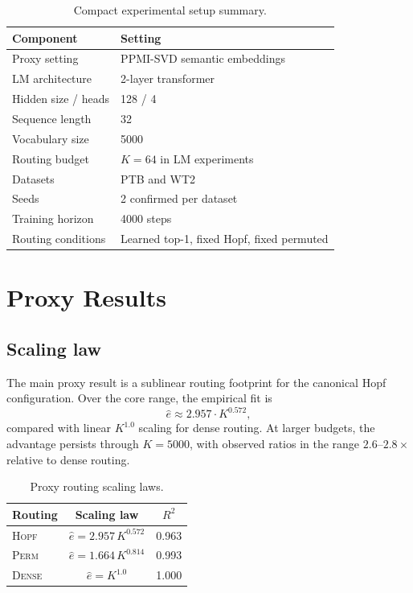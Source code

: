 \documentclass[10pt,conference]{IEEEtran}
\newcommand{\effb}{\hat e}
\newcommand{\hopf}{\textsc{Hopf}}
\newcommand{\perm}{\textsc{Perm}}
\newcommand{\dense}{\textsc{Dense}}
\begin{document}
\begin{table}[t]
\centering
\caption{Compact experimental setup summary.}
\label{tab:setup}
\small
\begin{tabular}{>{\raggedright\arraybackslash}p{}p{}}
\toprule
Component & Setting \\
\midrule
Proxy setting & PPMI-SVD semantic embeddings \\
LM architecture & 2-layer transformer \\
Hidden size / heads & 128 / 4 \\
Sequence length & 32 \\
Vocabulary size & 5000 \\
Routing budget & $K=64$ in LM experiments \\
Datasets & PTB and WT2 \\
Seeds & 2 confirmed per dataset \\
Training horizon & 4000 steps \\
Routing conditions & Learned top-1, fixed Hopf, fixed permuted \\
\bottomrule
\end{tabular}
\end{table}

\section{Proxy Results}
\subsection{Scaling law}
The main proxy result is a sublinear routing footprint for the canonical Hopf configuration. Over the core range, the empirical fit is
\begin{equation}
\effb \approx 2.957 \cdot K^{0.572},
\end{equation}
compared with linear $K^{1.0}$ scaling for dense routing. At larger budgets, the advantage persists through $K=5000$, with observed ratios in the range $2.6$--$2.8\times$ relative to dense routing.

\begin{table}[t]
\centering
\caption{Proxy routing scaling laws.}
\label{tab:scaling}
\small
\begin{tabular}{lcc}
\toprule
Routing & Scaling law & $R^2$ \\
\midrule
\hopf & $\effb = 2.957\,K^{0.572}$ & 0.963 \\
\perm & $\effb = 1.664\,K^{0.814}$ & 0.993 \\
\dense & $\effb = K^{1.0}$ & 1.000 \\
\bottomrule
\end{tabular}
\end{table}
\end{document}
